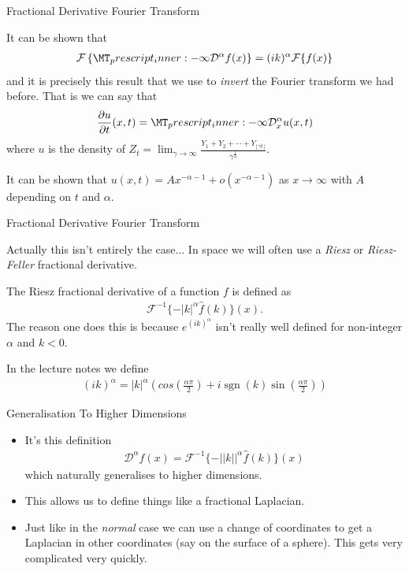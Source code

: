 \documentclass[pdf]{beamer}
\newcommand{\lra}{\longrightarrow}
\begin{document}
\begin{frame}{Fractional Derivative Fourier Transform}

	It can be shown that
	\begin{align}
	    \mathcal{F}\left\{\prescript{}{-\infty}{\mathcal{D}^\alpha}f(x) \right\} = (ik)^\alpha \mathcal{F}\{ f(x) \}
    \end{align}
    and it is precisely this result that we use to \emph{invert} the Fourier transform we had before.
    That is we can say that
    \begin{align}
        \frac{\partial u}{\partial t}(x,t) = \prescript{}{-\infty}{\mathcal{D}^\alpha_x} u(x,t)
    \end{align}
    where $u $ is the density of $ Z_t = \lim_{\gamma\lra\infty} \frac{Y_1 + Y_2 + \cdots + Y_{\lfloor \gamma t \rfloor}}{\gamma^\frac{1}{\alpha}} $.
    
    It can be shown that $ u(x,t) = Ax^{-\alpha-1} + o(x^{-\alpha-1}) $ as $ x \lra \infty $ with $ A $ depending on $ t $ and $ \alpha $.
\end{frame}

\begin{frame}{Fractional Derivative Fourier Transform}

    Actually this isn't entirely the case...
    In space we will often use a \emph{Riesz} or \emph{Riesz-Feller} fractional derivative. 
    
    The Riesz fractional derivative of a function $ f $ is defined as 
    \begin{align}
        \mathcal{F}^{-1}\{-|k|^\alpha \hat{f}(k) \}(x).
    \end{align}
    The reason one does this is because $ e^{(ik)^\alpha} $ isn't really well defined for non-integer $ \alpha $ and $ k < 0 $. 
    
    In the lecture notes we define
    \begin{align}
        (ik)^\alpha = |k|^\alpha\left(cos\left(\frac{\alpha\pi}{2}\right) + i\operatorname{sgn}(k)\sin\left(\frac{\alpha\pi}{2}\right)\right)
    \end{align}
\end{frame}

\begin{frame}{Generalisation To Higher Dimensions}
    \begin{itemize}
    \item It's this definition
    \begin{align}
        \mathcal{D}^\alpha f(x) = \mathcal{F}^{-1}\{-||k||^\alpha \hat{f}(k) \}(x)
    \end{align}
    which naturally generalises to higher dimensions.
    
    \item This allows us to define things like a fractional Laplacian.
    \item Just like in the \emph{normal} case we can use a change of coordinates to get a Laplacian in other coordinates (say on the surface of a sphere). This gets very complicated very quickly.
    \end{itemize}
\end{frame}
\end{document}
